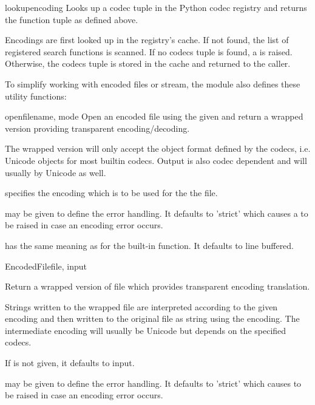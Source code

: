\begin{funcdesc}{lookup}{encoding}
Looks up a codec tuple in the Python codec registry and returns the
function tuple as defined above.

Encodings are first looked up in the registry's cache. If not found,
the list of registered search functions is scanned. If no codecs tuple
is found, a  is raised. Otherwise, the codecs
tuple is stored in the cache and returned to the caller.
\end{funcdesc}

To simplify working with encoded files or stream, the module
also defines these utility functions:

\begin{funcdesc}{open}{filename, mode}
Open an encoded file using the given  and return
a wrapped version providing transparent encoding/decoding.

 The wrapped version will only accept the object format
defined by the codecs, i.e. Unicode objects for most builtin
codecs. Output is also codec dependent and will usually by Unicode as
well.

 specifies the encoding which is to be used for the
the file.

 may be given to define the error handling. It defaults
to 'strict' which causes a  to be raised in case
an encoding error occurs.

 has the same meaning as for the built-in
 function.  It defaults to line buffered.
\end{funcdesc}

\begin{funcdesc}{EncodedFile}{file, input}

Return a wrapped version of file which provides transparent
encoding translation.

Strings written to the wrapped file are interpreted according to the
given  encoding and then written to the original file as
string using the  encoding. The intermediate encoding will
usually be Unicode but depends on the specified codecs.

If  is not given, it defaults to input.

 may be given to define the error handling. It defaults to
'strict' which causes  to be raised in case
an encoding error occurs.
\end{funcdesc}



